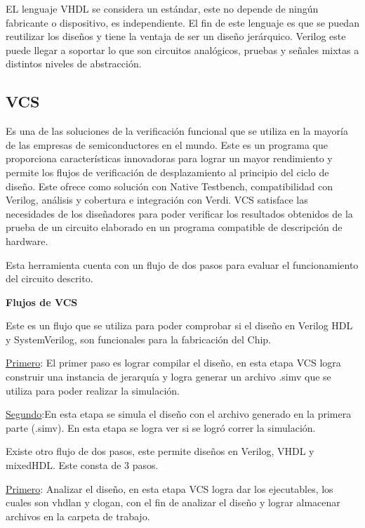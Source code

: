  EL lenguaje VHDL se considera un estándar, este no depende de ningún fabricante o dispositivo, es independiente. El fin de este lenguaje es que se puedan reutilizar los diseños y tiene la ventaja de ser un diseño jerárquico.  Verilog este puede llegar a soportar lo que son circuitos analógicos, pruebas y señales mixtas a distintos niveles de abstracción.

 \cite{DDH} 

\subsection*{VCS}

Es una de las soluciones de la verificación funcional que se utiliza en la mayoría de las empresas de semiconductores en el mundo. Este es un programa que proporciona características innovadoras para lograr un mayor rendimiento y permite los flujos de verificación de desplazamiento al principio del ciclo de diseño.
Este ofrece como solución con Native Testbench, compatibilidad con Verilog, análisis y cobertura e integración con Verdi. VCS satisface las necesidades de los diseñadores para poder verificar los resultados obtenidos de la prueba de un circuito elaborado en un programa compatible de descripción de hardware.

Esta herramienta cuenta con un flujo de dos pasos para evaluar el funcionamiento del circuito descrito.

 \cite{VCS} 

 
  \textbf{Flujos de VCS}  
  
  
  Este es un flujo que se utiliza para poder comprobar si el diseño en Verilog HDL y SystemVerilog, son funcionales para la fabricación del Chip.
  
  \underline{Primero}:  El primer paso es lograr compilar el diseño, en esta etapa VCS logra construir una instancia de jerarquía y logra generar un archivo .simv que se utiliza para poder realizar la simulación.
  
  \underline{Segundo}:En esta etapa se simula el diseño con el archivo generado en la primera parte (.simv). En esta etapa se logra ver si se logró correr la simulación.
  
  Existe otro flujo de dos pasos, este permite diseños en Verilog, VHDL y mixedHDL. Este consta de 3 pasos.
  
  \underline{Primero}:  Analizar el diseño, en esta etapa VCS logra dar los ejecutables, los cuales son vhdlan y clogan, con el fin de analizar el diseño y lograr almacenar archivos en la carpeta de trabajo.
  
